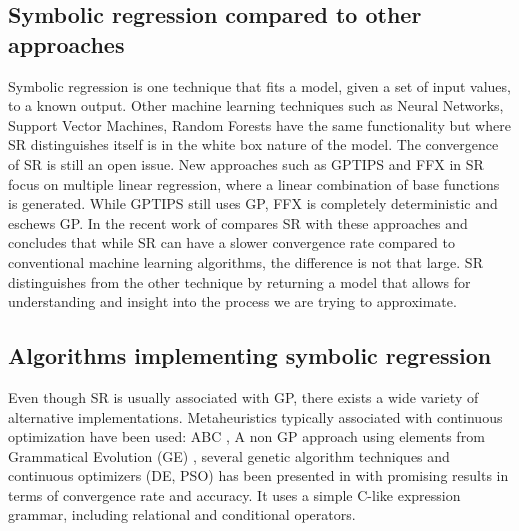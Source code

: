 \subsection{Symbolic regression compared to other approaches}
Symbolic regression is one technique that fits a model, given a set of input values, to a known output. Other machine learning techniques such as Neural Networks, Support Vector Machines, Random Forests have the same functionality but where SR distinguishes itself is in the white box nature of the model. The convergence of SR is still an open issue. New approaches such as GPTIPS and FFX \citep{GPTIPS, FFX} in SR focus on multiple linear regression, where a linear combination of base functions is generated. While GPTIPS still uses GP, FFX is completely deterministic and eschews GP.
In the recent work of \citep{SRlinear} compares SR with these approaches and concludes that while SR can have a slower convergence rate compared to conventional machine learning algorithms, the difference is not that large. SR distinguishes from the other technique by returning a model that allows for understanding and insight into the process we are trying to approximate.

\subsection{Algorithms implementing symbolic regression}
Even though SR is usually associated with GP, there exists a wide variety of alternative implementations. Metaheuristics typically associated with continuous optimization have been used: ABC \cite{ABCSR}, 
A non GP approach using elements from Grammatical Evolution (GE) \cite{GE}, several genetic algorithm techniques and continuous optimizers (DE, PSO) has been presented in \citep{AEG} with promising results in terms of convergence rate and accuracy. It uses a simple C-like expression grammar, including relational and conditional operators.

